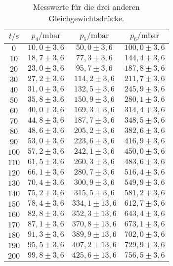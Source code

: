 \begin{table}[H]
  \centering
  \caption{Messwerte für die drei anderen Gleichgewichtsdrücke.}
  \label{tab:drehleck}
  \begin{tabular}{c c c c}
    \toprule
    $t/\si{\second}$ & $p_4 /\si{\milli\bar}$ & $p_5 /\si{\milli\bar}$ & $p_6 /\si{\milli\bar}$ \\
    \midrule
    $  0$ & $ 10,0 \pm 3,6 $ & $  50,0 \pm  3,6 $ & $ 100,0 \pm 3,6 $ \\ 
    $ 10$ & $ 18,7 \pm 3,6 $ & $  77,3 \pm  3,6 $ & $ 144,4 \pm 3,6 $ \\ 
    $ 20$ & $ 23,0 \pm 3,6 $ & $  95,7 \pm  3,6 $ & $ 187,8 \pm 3,6 $ \\ 
    $ 30$ & $ 27,2 \pm 3,6 $ & $ 114,2 \pm  3,6 $ & $ 211,7 \pm 3,6 $ \\ 
    $ 40$ & $ 31,0 \pm 3,6 $ & $ 132,5 \pm  3,6 $ & $ 245,9 \pm 3,6 $ \\ 
    $ 50$ & $ 35,8 \pm 3,6 $ & $ 150,9 \pm  3,6 $ & $ 280,1 \pm 3,6 $ \\ 
    $ 60$ & $ 40,0 \pm 3,6 $ & $ 169,3 \pm  3,6 $ & $ 314,4 \pm 3,6 $ \\ 
    $ 70$ & $ 44,8 \pm 3,6 $ & $ 187,7 \pm  3,6 $ & $ 348,5 \pm 3,6 $ \\ 
    $ 80$ & $ 48,6 \pm 3,6 $ & $ 205,2 \pm  3,6 $ & $ 382,6 \pm 3,6 $ \\ 
    $ 90$ & $ 53,0 \pm 3,6 $ & $ 223,6 \pm  3,6 $ & $ 416,9 \pm 3,6 $ \\ 
    $100$ & $ 57,2 \pm 3,6 $ & $ 242,1 \pm  3,6 $ & $ 450,0 \pm 3,6 $ \\ 
    $110$ & $ 61,5 \pm 3,6 $ & $ 260,3 \pm  3,6 $ & $ 483,6 \pm 3,6 $ \\ 
    $120$ & $ 66,1 \pm 3,6 $ & $ 280,7 \pm  3,6 $ & $ 516,4 \pm 3,6 $ \\ 
    $130$ & $ 70,4 \pm 3,6 $ & $ 300,9 \pm  3,6 $ & $ 549,9 \pm 3,6 $ \\ 
    $140$ & $ 75,2 \pm 3,6 $ & $ 315,5 \pm  3,6 $ & $ 581,2 \pm 3,6 $ \\ 
    $150$ & $ 78,4 \pm 3,6 $ & $ 334,1 \pm 13,6 $ & $ 612,7 \pm 3,6 $ \\ 
    $160$ & $ 82,8 \pm 3,6 $ & $ 352,3 \pm 13,6 $ & $ 643,4 \pm 3,6 $ \\ 
    $170$ & $ 87,1 \pm 3,6 $ & $ 370,8 \pm 13,6 $ & $ 673,1 \pm 3,6 $ \\ 
    $180$ & $ 91,3 \pm 3,6 $ & $ 389,9 \pm 13,6 $ & $ 702,0 \pm 3,6 $ \\ 
    $190$ & $ 95,5 \pm 3,6 $ & $ 407,2 \pm 13,6 $ & $ 729,9 \pm 3,6 $ \\ 
    $200$ & $ 99,8 \pm 3,6 $ & $ 425,6 \pm 13,6 $ & $ 756,5 \pm 3,6 $ \\ 
    \bottomrule
  \end{tabular}
\end{table}

